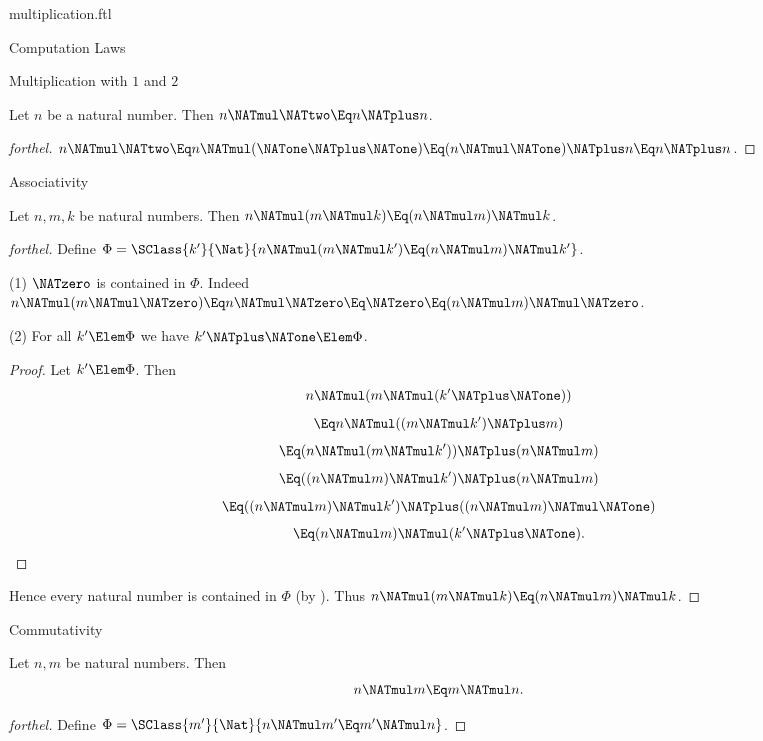 \documentclass{stex}
\begin{document}
\begin{smodule}{multiplication.ftl}
\begin{sfragment}{Computation Laws}
\begin{sfragment}{Multiplication with $1$ and $2$}
    \begin{corollary}[forthel,id=ARITHMETIC_06_5679541582299136]
      Let $n$ be a natural number.
      Then $n \NATmul \NATtwo \Eq n \NATplus n$.
    \end{corollary}
    \begin{proof}[forthel]
      $n \NATmul \NATtwo
        \Eq n \NATmul (\NATone \NATplus \NATone)
        \Eq (n \NATmul \NATone) \NATplus n
        \Eq n \NATplus n$.
    \end{proof}
  \end{sfragment}

  \begin{sfragment}{Associativity}
    \begin{proposition}[forthel,id=ARITHMETIC_06_347295585402880]
      Let $n, m, k$ be natural numbers.
      Then $n \NATmul (m \NATmul k) \Eq (n \NATmul m) \NATmul k$.
    \end{proposition}
    \begin{proof}[forthel]
      Define $\Phi = \SClass{k'}{\Nat}{n \NATmul (m \NATmul k') \Eq (n \NATmul m) \NATmul k'}$.

      (1) $\NATzero$ is contained in $\Phi$.
      Indeed $n \NATmul (m \NATmul \NATzero)
        \Eq n \NATmul \NATzero
        \Eq \NATzero
        \Eq (n \NATmul m) \NATmul \NATzero$.

      (2) For all $k' \Elem \Phi$ we have $k' \NATplus \NATone \Elem \Phi$.
      \begin{proof}
        Let $k' \Elem \Phi$.
        Then
        \[  n \NATmul (m \NATmul (k' \NATplus \NATone))                          \]
        \[    \Eq n \NATmul ((m \NATmul k') \NATplus m)                      \]
        \[    \Eq (n \NATmul (m \NATmul k')) \NATplus (n \NATmul m)            \]
        \[    \Eq ((n \NATmul m) \NATmul k') \NATplus (n \NATmul m)            \]
        \[    \Eq ((n \NATmul m) \NATmul k') \NATplus ((n \NATmul m) \NATmul \NATone)  \]
        \[    \Eq (n \NATmul m) \NATmul (k' \NATplus \NATone).                     \]
      \end{proof}

      Hence every natural number is contained in $\Phi$ (by ).
      Thus $n \NATmul (m \NATmul k) \Eq (n \NATmul m) \NATmul k$.
    \end{proof}
  \end{sfragment}

  \begin{sfragment}{Commutativity}
    \begin{proposition}[forthel,id=ARITHMETIC_06_1764759896588288]
      Let $n, m$ be natural numbers.
      Then \[ n \NATmul m \Eq m \NATmul n. \]
    \end{proposition}
    \begin{proof}[forthel]
      Define $\Phi = \SClass{m'}{\Nat}{n \NATmul m' \Eq m' \NATmul n}$.


\end{proof}
\end{sfragment}
\end{sfragment}
\end{smodule}
\end{document}

